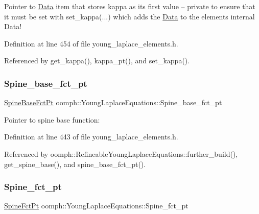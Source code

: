 Pointer to \hyperlink{classoomph_1_1Data}{Data} item that stores kappa as its first value -- private to ensure that it must be set with set\+\_\+kappa(...) which adds the \hyperlink{classoomph_1_1Data}{Data} to the element\textquotesingle{}s internal Data! 



Definition at line 454 of file young\+\_\+laplace\+\_\+elements.\+h.



Referenced by get\+\_\+kappa(), kappa\+\_\+pt(), and set\+\_\+kappa().

\mbox{\label{classoomph_1_1YoungLaplaceEquations_af40879c321f957ff4fb450abcb61a78f}} 
\subsubsection{\texorpdfstring{Spine\+\_\+base\+\_\+fct\+\_\+pt}{Spine\_base\_fct\_pt}}
{\footnotesize\ttfamily \hyperlink{classoomph_1_1YoungLaplaceEquations_a5e09288f5d3b710f23e8e57401a48ccc}{Spine\+Base\+Fct\+Pt} oomph\+::\+Young\+Laplace\+Equations\+::\+Spine\+\_\+base\+\_\+fct\+\_\+pt\hspace{0.3cm}{\ttfamily [protected]}}



Pointer to spine base function\+: 



Definition at line 443 of file young\+\_\+laplace\+\_\+elements.\+h.



Referenced by oomph\+::\+Refineable\+Young\+Laplace\+Equations\+::further\+\_\+build(), get\+\_\+spine\+\_\+base(), and spine\+\_\+base\+\_\+fct\+\_\+pt().

\mbox{\label{classoomph_1_1YoungLaplaceEquations_aceae254105250eef19e75751fdbf45b9}} 
\subsubsection{\texorpdfstring{Spine\+\_\+fct\+\_\+pt}{Spine\_fct\_pt}}
{\footnotesize\ttfamily \hyperlink{classoomph_1_1YoungLaplaceEquations_a97448cfb2f6361e986d363d9e4463f9f}{Spine\+Fct\+Pt} oomph\+::\+Young\+Laplace\+Equations\+::\+Spine\+\_\+fct\+\_\+pt\hspace{0.3cm}{\ttfamily [protected]}}



